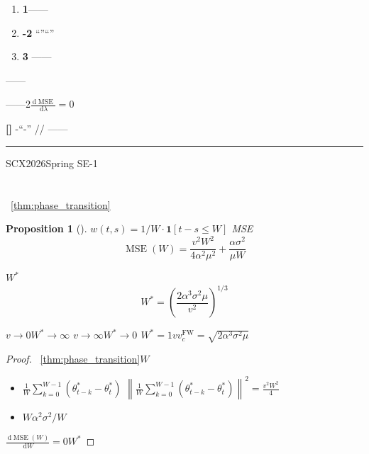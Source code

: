 \documentclass[11pt,a4paper]{article}
\newtheorem{proposition}[theorem]{Proposition}
\theoremstyle{remark}
\DeclareMathOperator{\MSE}{MSE}
\newcommand{\norm}[1]{\left\lVert#1\right\rVert}
\newcommand{\dd}{\,\mathrm{d}}
\newcommand{\metaphor}{\textnormal{\textbf{[]}}}
\begin{document}
\begin{enumerate}[label=(\arabic*)]
    \item \textbf{1}——
          
          \textbf{}
    \item \textbf{-2}
          ``''``''
          
    \item \textbf{3}
          ——
          \textbf{}
\end{enumerate}

\textbf{}——



——2$\frac{\dd\MSE}{\dd\lambda} = 0$


\metaphor{} \textbf{}
-``-''
//
——


\vspace{12pt}
\begin{center}
\rule{0.5\textwidth}{0.4pt}
\end{center}
\vspace{12pt}

\textbf{}SCX2026Spring SE-1


\appendix

\section{}

~\ref{thm:phase_transition}

\begin{proposition}[]\label{prop:fw_critical}
$w(t, s) = 1/W \cdot \mathbf{1}[t-s \leq W]$
MSE
\begin{equation}
    \MSE(W) = \frac{v^2 W^2}{4\alpha^2\mu^2} + \frac{\alpha\sigma^2}{\mu W}
\end{equation}

$W^*$
\begin{equation}
    W^* = \left(\frac{2\alpha^3\sigma^2\mu}{v^2}\right)^{1/3}
\end{equation}

$v \to 0$$W^* \to \infty$
$v \to \infty$$W^* \to 0$
$W^* = 1$$v$$v_c^{\text{FW}} = \sqrt{2\alpha^3\sigma^2\mu}$
\end{proposition}

\begin{proof}
~\ref{thm:phase_transition}$W$
\begin{itemize}
    \item $\frac{1}{W}\sum_{k=0}^{W-1}(\theta_{t-k}^* - \theta_t^*)$
          $\norm{\frac{1}{W}\sum_{k=0}^{W-1}(\theta_{t-k}^* - \theta_t^*)}^2 = \frac{v^2 W^2}{4}$
    \item $W$$\alpha^2\sigma^2/W$
\end{itemize}
$\frac{\dd \MSE(W)}{\dd W} = 0$$W^*$
\end{proof}
\end{document}
